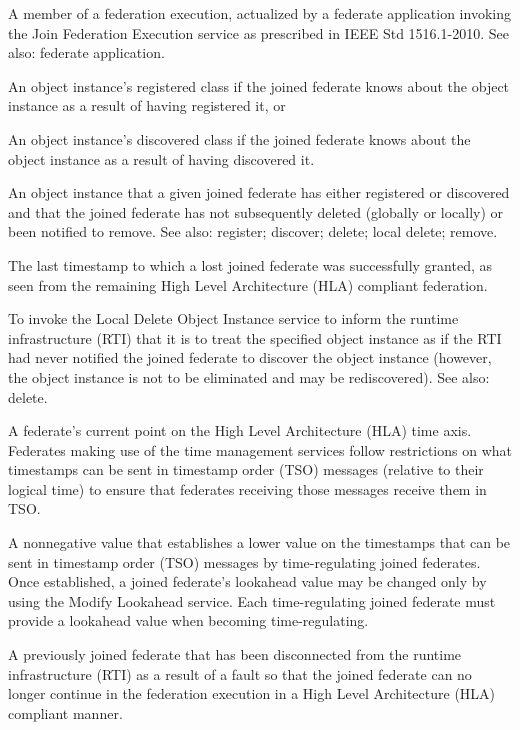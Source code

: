 A member of a federation execution, actualized by a federate application invoking the Join Federation Execution service as prescribed in IEEE Std 1516.1-2010. See also: federate application.

\begin{stdalphalist}
    \item An object instance's registered class if the joined federate knows about the object instance as a result of having registered it, or
    \item An object instance's discovered class if the joined federate knows about the object instance as a result of having discovered it.
\end{stdalphalist}

 An object instance that a given joined federate has either registered or discovered and that the joined federate has not subsequently deleted (globally or locally) or been notified to remove. See also: register; discover; delete; local delete; remove.

 The last timestamp to which a lost joined federate was successfully granted, as seen from the remaining High Level Architecture (HLA) compliant federation.

\clearpage
{} To invoke the Local Delete Object Instance service to inform the runtime infrastructure (RTI) that it is to treat the specified object instance as if the RTI had never notified the joined federate to discover the object instance (however, the object instance is not to be eliminated and may be rediscovered). See also: delete.

 A federate's current point on the High Level Architecture (HLA) time axis. Federates making use of the time management services follow restrictions on what timestamps can be sent in timestamp order (TSO) messages (relative to their logical time) to ensure that federates receiving those messages receive them in TSO.

 A nonnegative value that establishes a lower value on the timestamps that can be sent in timestamp order (TSO) messages by time-regulating joined federates. Once established, a joined federate's lookahead value may be changed only by using the Modify Lookahead service. Each time-regulating joined federate must provide a lookahead value when becoming time-regulating.

 A previously joined federate that has been disconnected from the runtime infrastructure (RTI) as a result of a fault so that the joined federate can no longer continue in the federation execution in a High Level Architecture (HLA) compliant manner.

